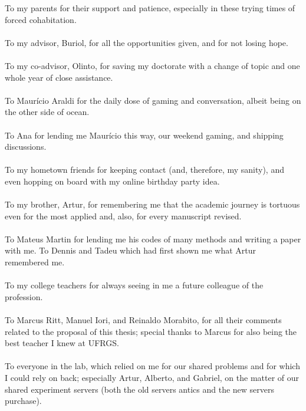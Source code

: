 \documentclass[ppgc,tese,english,formais,babel]{iiufrgs}
\begin{document}
\noindent
To my parents for their support and patience, especially in these trying times of forced cohabitation.\\\\
To my advisor, Buriol, for all the opportunities given, and for not losing hope.\\\\
To my co-advisor, Olinto, for saving my doctorate with a change of topic and one whole year of close assistance.\\\\
To Maurício Araldi for the daily dose of gaming and conversation, albeit being on the other side of ocean.\\\\
To Ana for lending me Maurício this way, our weekend gaming, and shipping discussions.\\\\
To my hometown friends for keeping contact (and, therefore, my sanity), and even hopping on board with my online birthday party idea.\\\\
To my brother, Artur, for remembering me that the academic journey is tortuous even for the most applied and, also, for every manuscript revised.\\\\
To Mateus Martin for lending me his codes of many methods and writing a paper with me.
To Dennis and Tadeu which had first shown me what Artur remembered me.\\\\
To my college teachers for always seeing in me a future colleague of the profession.\\\\
To Marcus Ritt, Manuel Iori, and Reinaldo Morabito, for all their comments related to the proposal of this thesis; special thanks to Marcus for also being the best teacher I knew at UFRGS.\\\\
To everyone in the lab, which relied on me for our shared problems and for which I could rely on back; especially Artur, Alberto, and Gabriel, on the matter of our shared experiment servers (both the old servers antics and the new servers purchase).\\\\
\end{document}
